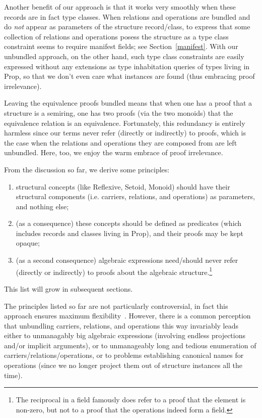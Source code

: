 \documentclass[a4paper,10pt, runningheads]{llncs}
\begin{document}
Another benefit of our approach is that it works very smoothly when these records are in fact type
classes. When relations and operations are bundled and do \emph{not} appear as parameters of the
structure record/class, to express that some collection of relations and
operations posess the structure as a type class constraint seems to require manifest fields; see
Section~\ref{manifest}. With
our unbundled approach, on the other hand, such type class constraints are easily expressed without
any extensions as type inhabitation queries
of types living in Prop, so that we don't even care what instances are found (thus embracing proof
irrelevance).

Leaving the equivalence proofs bundled means that when one has a proof that a structure
is a semiring, one has two proofs (via the two monoids) that the equivalence relation is an
equivalence. Fortunately, this redundancy is entirely harmless since our terms
never refer (directly or indirectly) to proofs, which is the case when the relations and operations
they are composed from are left unbundled. Here, too, we enjoy the warm embrace of proof
irrelevance.

From the discussion so far, we derive some principles:
\begin{enumerate}
 \item structural concepts (like Reflexive, Setoid, Monoid) should have their structural components
(i.e. carriers, relations, and operations) as parameters, and nothing else;
 \item (as a consequence) these concepts should be defined as predicates (which includes records and
classes living in Prop), and their proofs may be kept opaque;
 \item (as a second consequence) algebraic expressions need/should never refer (directly or
indirectly) to proofs about the algebraic structure.\footnote{The reciprocal in a field
famously does refer to a proof that the element is non-zero, but not to a proof that the operations
indeed form a field.}
\end{enumerate}

This list will grow in subsequent sections.

The principles listed so far are not particularly controversial, in fact this
approach ensures maximum flexibility~\cite{Hints}. However,
there is a common perception that unbundling carriers, relations, and operations this way invariably
leads either to unmanagably big algebraic expressions (involving endless projections and/or implicit
arguments), or to unmanageably long and tedious enumeration of carriers/relations/operations, or to
problems establishing canonical names for operations (since we no longer project them out of
structure instances all the time).
\end{document}
